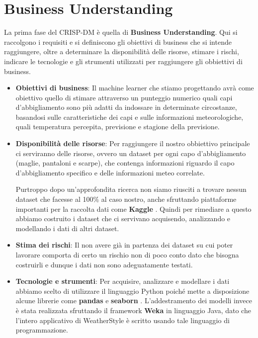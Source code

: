 \documentclass[a4paper, 11pt, oneside]{report}
\begin{document}
            \section{Business Understanding}
            La prima fase del CRISP-DM è quella di \textbf{Business Understanding}.
            Qui si raccolgono i requisiti e si definiscono gli obiettivi di business che si intende raggiungere, oltre a
            determinare la disponibilità delle risorse, stimare i rischi, indicare le tecnologie e gli strumenti utilizzati
            per raggiungere gli obbiettivi di business.
            \par \noindent
            \begin{itemize}
                \item \textbf{Obiettivi di business}: Il machine learner che stiamo progettando avrà come obiettivo quello di
                stimare attraverso un punteggio numerico quali capi d'abbigliamento sono più adatti da indossare in
                determinate circostanze, basandosi
                sulle caratteristiche dei capi e sulle informazioni meteorologiche, quali temperatura percepita, previsione e
                stagione della previsione.
                \item \textbf{Disponibilità delle risorse}: Per raggiungere il nostro obbiettivo principale ci serviranno
                delle risorse, ovvero un dataset per ogni capo d'abbigliamento (maglie, pantaloni e scarpe),
                che contenga informazioni riguardo il capo d'abbigliamento specifico e delle informazioni meteo correlate.
                \par \noindent Purtroppo dopo un'approfondita ricerca non siamo riusciti a trovare nessun dataset che facesse
                al 100\% al caso nostro, anche sfruttando piattaforme importanti per la raccolta dati come \textbf{Kaggle} \cite{3}.
                Quindi per rimediare a questo abbiamo costruito i dataset che ci servivano acquisendo, analizzando e modellando
                i dati di altri dataset.
                \item \textbf{Stima dei rischi}: Il non avere già in partenza dei dataset su cui poter lavorare comporta
                di certo un rischio non di poco conto dato che bisogna costruirli e dunque i dati non sono adeguatamente testati.
                \item \textbf{Tecnologie e strumenti}: Per acquisire, analizzare e modellare i dati abbiamo scelto di utilizzare
                il linguaggio Python poiché mette a disposizione alcune librerie come \textbf{pandas} \cite{4} e \textbf{seaborn} \cite{5}.
                L'addestramento dei modelli invece è stata realizzata
                sfruttando il framework \textbf{Weka} \cite{2} in linguaggio Java, dato che l'intero applicativo di WeatherStyle
                è scritto usando tale linguaggio di programmazione.
            \end{itemize}
\end{document}
